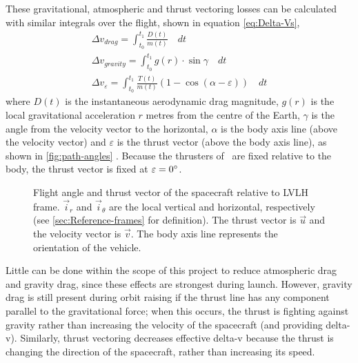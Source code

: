 These gravitational, atmospheric and thrust vectoring losses can be calculated with similar integrals over the flight, shown in equation \eqref{eq:Delta-Vs},
\begin{subequations} \label{eq:Delta-Vs}
\begin{gather}
\Delta v_{drag}=\int_{t_0}^{t_1}\frac{D(t)}{m(t)}\quad dt \label{eq:drag-penalty} \\
\Delta v_{gravity}=\int_{t_0}^{t_1}g(r)\cdot\sin\gamma\quad dt \label{eq:gravity-penalty} \\
\Delta v_\varepsilon=\int_{t_0}^{t_1}\frac{T(t)}{m(t)}(1-\cos(\alpha-\varepsilon))\quad dt \label{eq:thrust-vectoring-penalty}
\end{gather}
\end{subequations}
where $D(t)$ is the instantaneous aerodynamic drag magnitude, $g(r)$ is the local gravitational acceleration $r$ metres from the centre of the Earth, $\gamma$ is the angle from the velocity vector to the horizontal, $\alpha$ is the body axis line (above the velocity vector) and $\varepsilon$ is the thrust vector (above the body axis line), as shown in \autoref{fig:path-angles} \parencite{Tetlow2003}. Because the thrusters of \BW\ are fixed relative to the body, the thrust vector is fixed at $\varepsilon=0^\circ$.

\begin{figure}
\caption{Flight angle and thrust vector of the spacecraft relative to LVLH frame. $\vec{i}_r$ and $\vec{i}_\theta$ are the local vertical and horizontal, respectively (see \autoref{sec:Reference-frames} for definition). The thrust vector is $\vec{u}$ and the velocity vector is $\vec{v}$. The body axis line represents the orientation of the vehicle.} 
\label{fig:path-angles}
\centering
\def\svgwidth{0.4\textwidth}

\end{figure}

Little can be done within the scope of this project to reduce atmospheric drag and gravity drag, since these effects are strongest during launch. However, gravity drag is still present during orbit raising if the thrust line has any component parallel to the gravitational force; when this occurs, the thrust is fighting against gravity rather than increasing the velocity of the spacecraft (and providing delta-v). Similarly, thrust vectoring decreases effective delta-v because the thrust is changing the direction of the spacecraft, rather than increasing its speed. 
 
